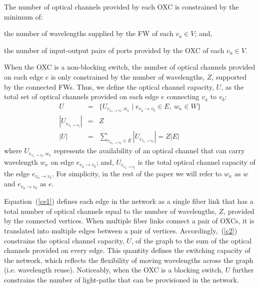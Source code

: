 \documentclass[journal]{IEEEtran}
\begin{document}
The number of optical channels provided by each OXC is constrained by the minimum of: 
\begin{inparaenum}
\item the number of wavelengths supplied by the FW of each $v_a \in V$; and,
\item the number of input-output pairs of ports provided by the OXC of each $v_a \in V$.
\end{inparaenum}
When the OXC is a non-blocking switch, the number of optical channels provided on each edge $e$ is only constrained by the number of wavelengths, $Z$, supported by the connected FWs.
Thus, we define the optical channel capacity, $U$, as the total set of optical channels provided on each edge $e$ connecting $v_a$ to $v_b$:
\begin{eqnarray}
U &=& \{U_{e_{v_a \rightarrow v_b},w_\kappa} \mid e_{v_a \rightarrow v_b} \in E, \ w_\kappa \in W \} \label{c1}
\\
|U_{e_{v_a \rightarrow v_b}}| & =& Z \label{ce1}
\\
|U| & = &  \sum_{e_{v_a \rightarrow v_b} \in E} |U_{e_{v_a \rightarrow v_b}}| = Z |E| \label{c2}
\end{eqnarray}
where $U_{e_{v_a \rightarrow v_b}, w_\kappa}$ represents the availability
of an optical channel that can carry wavelength $w_\kappa$ on edge $e_{v_a \rightarrow v_b}$; and, $U_{e_{v_a \rightarrow v_b}}$ is the
total optical channel capacity of the edge $e_{v_a \rightarrow v_b}$. For simplicity, in the rest of the paper we will refer to $w_\kappa$ as $w$ and $e_{v_a \rightarrow v_b}$ as $e$.

Equation~(\ref{ce1}) defines each edge in the network as a
single fiber link that has a total number of optical channels equal to the number of
wavelengths, $Z$, provided by the connected vertices. When multiple fiber links connect a
pair of OXCs, it is translated into multiple edges between a pair of vertices.
Accordingly,~(\ref{c2}) constrains the optical channel capacity, $U$, of the graph to the sum of the optical channels provided on every edge. This quantity defines the switching capacity of the network, which reflects the flexibility of moving wavelengths across the graph (i.e. wavelength reuse). 
Noticeably, when the OXC is a blocking switch, $U$ further constrains the number of light-paths that can be provisioned in the network.
\end{document}
